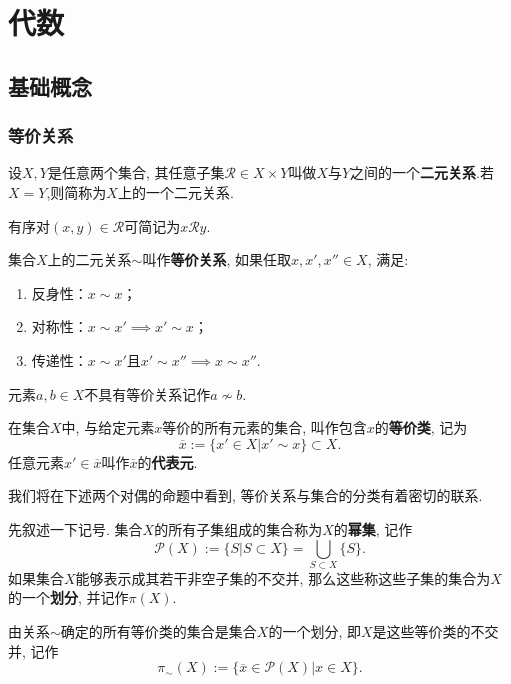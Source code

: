 \documentclass[color=green,mathpazo,titlestyle=hang]{elegantbook}
\begin{document}
\chapter{代数}
\section{基础概念}

\subsection{等价关系}

\begin{newdef}[二元关系]
	设$X,Y$是任意两个集合, 其任意子集$\mathcal{R}\in X\times Y$叫做$X$与$Y$之间的一个\textbf{二元关系}.若$X=Y$,则简称为$X$上的一个二元关系.	
\end{newdef}
有序对$(x,y)\in\mathcal{R}$可简记为$x\mathcal{R} y$.

\begin{newdef}[等价关系]
	集合$X$上的二元关系$\sim$叫作\textbf{等价关系}, 如果任取$x,x',x''\in X$, 满足:
	\begin{enumerate}
		\item 反身性：$x\sim x$；
		\item 对称性：$x\sim x'\implies x'\sim x$；
		\item 传递性：$x\sim x'$且$x'\sim x''\implies x\sim x''$.
	\end{enumerate}
\end{newdef}


元素$a,b\in X$不具有等价关系记作$a\not\sim b$.

\begin{newdef}[等价类]
	在集合$X$中, 与给定元素$x$等价的所有元素的集合, 叫作包含$x$的\textbf{等价类}, 记为
	\[\overline{x}:=\{x'\in X|x'\sim x\}\subset X.\]
	任意元素$x'\in\overline{x}$叫作$\overline{x}$的\textbf{代表元}.
\end{newdef}


我们将在下述两个对偶的命题中看到, 等价关系与集合的分类有着密切的联系.

先叙述一下记号. 集合$X$的所有子集组成的集合称为$X$的\textbf{幂集}, 记作
\[\mathcal{P}(X):=\{S|S\subset X\}=\bigcup_{S\subset X}\{S\}.\]
如果集合$X$能够表示成其若干非空子集的不交并, 那么这些称这些子集的集合为$X$的一个\textbf{划分}, 并记作$\pi(X)$.


\begin{newprop}
	由关系$\sim$确定的所有等价类的集合是集合$X$的一个划分, 即$X$是这些等价类的不交并, 记作
	\[\pi_{\sim}(X):=\{\overline{x}\in \mathcal{P}(X)|x\in X\}.\]
\end{newprop}
\end{document}
